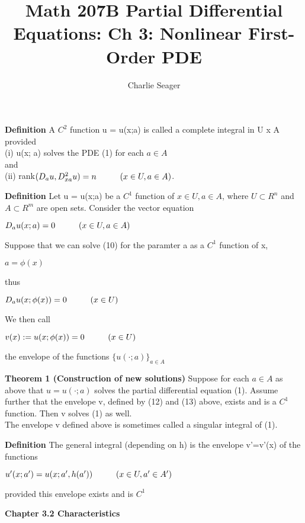 \documentclass{article}
\newcommand\tab[1][1cm]{\hspace*{#1}}
\begin{document}
\title {Math 207B Partial Differential Equations: Ch 3: Nonlinear First-Order PDE}

\author{Charlie Seager}

\maketitle

\textbf {Definition} A $C^2$ function u = u(x;a) is called a complete integral in U x A provided \\
(i) \tab \tab u(x; a) solves the PDE (1) for each $a \in A$ \\
and \\
(ii) \tab \tab rank$(D_a u, D^2_{xa}u ) = n \tab (x \in U, a \in A)$.

\textbf {Definition} Let u = u(x;a) be a $C^1$ function of $x \in U, a \in A$, where $U \subset R^n$ and $A \subset R^m$ are open sets. Consider the vector equation 
\begin{center}
$D_a u(x;a) = 0 \tab (x \in U, a \in A)$
\end{center}
Suppose that we can solve (10) for the paramter a as a $C^1$ function of x,
\begin{center}
$a = \phi(x)$
\end{center}
thus \\
\begin{center}
$D_a u(x; \phi(x))=0 \tab (x \in U)$
\end{center}
We then call
\begin{center}
$v(x) := u(x; \phi(x)) = 0 \tab (x \in U)$
\end{center}
the envelope of the functions $\{u(\cdot ; a)\}_{a \in A}$

\textbf {Theorem 1 (Construction of new solutions)} Suppose for each $a \in A$ as above that $u=u(\cdot ; a)$ solves the partial differential equation (1). Assume further that the envelope v, defined by (12) and (13) above, exists and is a $C^1$ function. Then v solves (1) as well. \\ The envelope v defined above is sometimes called a singular integral of (1).

\textbf {Definition} The general integral (depending on h) is the envelope v'=v'(x) of the functions
\begin{center}
$u'(x;a') = u(x; a',h(a')) \tab (x \in U, a' \in A')$
\end{center}
provided this envelope exists and is $C^1$

\textbf {Chapter 3.2 Characteristics}
\end{document}
